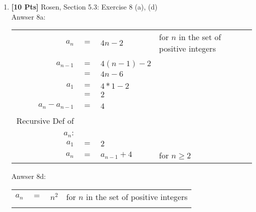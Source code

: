 \begin{enumerate}

\item {\bf [10 Pts]} Rosen, Section 5.3: Exercise 8 (a), (d)\\
Anwser 8a:\\

\begin{table}[h]
\centering
\begin{tabular}{rcll}
$a_n$                   & $=$ & $4n-2$        & for $n$ in the set of positive integers \\
                        &     &               &                                         \\
$a_{n-1}$               & $=$ & $4(n-1)-2$    &                                         \\
                        & $=$ & $4n-6$        &                                         \\
                        &     &               &                                         \\
$a_1$                   & $=$ & $4*1-2$       &                                         \\
                        & $=$ & $2$           &                                         \\
                        &     &               &                                         \\
$a_n - a_{n-1}$         & $=$ & $4$           &                                         \\
                        &     &               &                                         \\
Recursive Def of $a_n$: &     &               &                                         \\
$a_1$                   & $=$ & $2$           &                                         \\
$a_n$                   & $=$ & $a_{n-1} + 4$ & for $n \geq 2$                         
\end{tabular}
\end{table}
Anwser 8d:\\
\begin{table}[h]
\centering
\begin{tabular}{rcll}
$a_n$                   & $=$ & $n^2$            & for $n$ in the set of positive integers \\
                        &     &                  &                                         \\

\end{tabular}
\end{table}
\end{enumerate}

